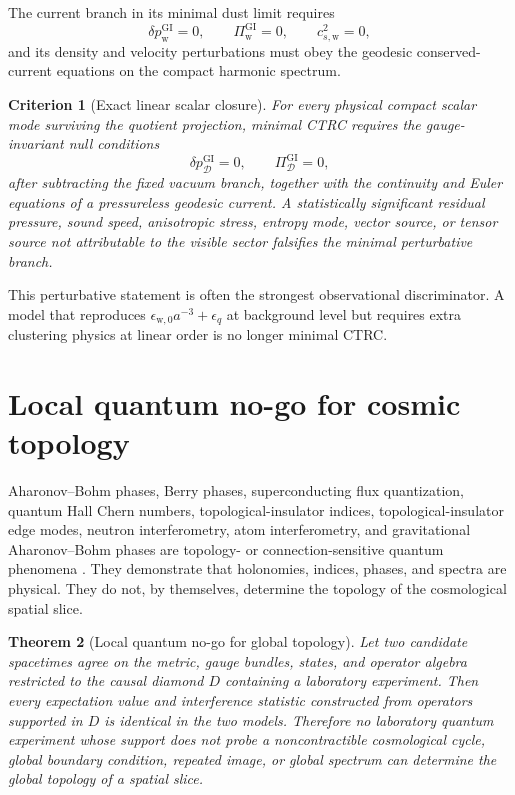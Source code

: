 \documentclass[
  aps,
  prd,
  reprint,
  superscriptaddress,
  floatfix,
  nofootinbib,
  longbibliography
]{revtex4-2}
\theoremstyle{plain}
\newtheorem{theorem}{Theorem}
\newtheorem{criterion}[theorem]{Criterion}
\theoremstyle{definition}
\theoremstyle{remark}
\newcommand{\D}{\mathcal D}
\newcommand{\w}{\mathrm w}
\newcommand{\GI}{\mathrm{GI}}
\newcommand{\eps}{\epsilon}
\begin{document}
The current branch in its minimal dust limit requires
\begin{equation}
\delta p_{\w}^{\GI}=0,\qquad
\Pi_{\w}^{\GI}=0,\qquad
c^2_{s,\w}=0,
\label{eq:dust_null_conditions}
\end{equation}
and its density and velocity perturbations must obey the geodesic conserved-current equations on the compact harmonic spectrum.

\begin{criterion}[Exact linear scalar closure]
For every physical compact scalar mode surviving the quotient projection, minimal CTRC requires the gauge-invariant null conditions
\begin{equation}
\boxed{
\delta p_\D^{\GI}=0,\qquad
\Pi_\D^{\GI}=0,
}
\label{eq:linear_null_pressure_anisotropy}
\end{equation}
after subtracting the fixed vacuum branch, together with the continuity and Euler equations of a pressureless geodesic current.  A statistically significant residual pressure, sound speed, anisotropic stress, entropy mode, vector source, or tensor source not attributable to the visible sector falsifies the minimal perturbative branch.
\end{criterion}

This perturbative statement is often the strongest observational discriminator.  A model that reproduces \(\eps_{\w,0}a^{-3}+\eps_q\) at background level but requires extra clustering physics at linear order is no longer minimal CTRC.

\section{Local quantum no-go for cosmic topology}

Aharonov--Bohm phases, Berry phases, superconducting flux quantization,
quantum Hall Chern numbers, topological-insulator indices, topological-insulator
edge modes, neutron interferometry, atom interferometry, and gravitational
Aharonov--Bohm phases are topology- or connection-sensitive quantum phenomena
\cite{AharonovBohm,Tonomura,DeaverFairbank,Berry,TKNN,Konig,COW,Overstreet}.
They demonstrate that holonomies, indices, phases, and spectra are physical.
They do not, by themselves, determine the topology of the cosmological spatial
slice.

\begin{theorem}[Local quantum no-go for global topology]
Let two candidate spacetimes agree on the metric, gauge bundles, states, and operator algebra restricted to the causal diamond \(D\) containing a laboratory experiment.  Then every expectation value and interference statistic constructed from operators supported in \(D\) is identical in the two models.  Therefore no laboratory quantum experiment whose support does not probe a noncontractible cosmological cycle, global boundary condition, repeated image, or global spectrum can determine the global topology of a spatial slice.
\end{theorem}
\end{document}
